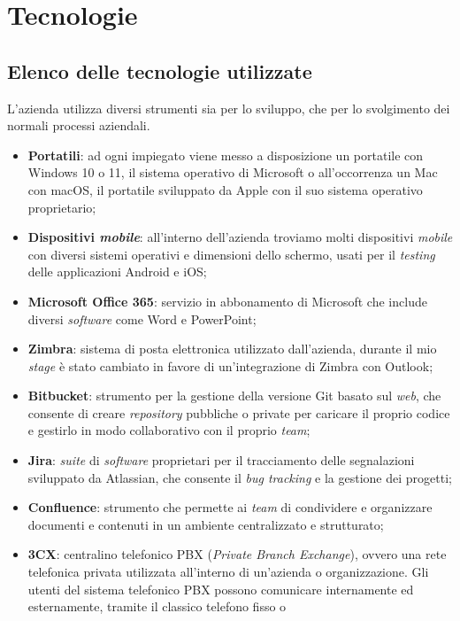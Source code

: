 \section{Tecnologie}\label{chap:Tecnologie}
\subsection{Elenco delle tecnologie utilizzate}
L'azienda utilizza diversi strumenti sia per lo sviluppo, che per lo svolgimento dei normali processi aziendali.
\begin{itemize}
    \item \textbf{Portatili}: ad ogni impiegato viene messo a disposizione un portatile con Windows 10 o 11, il sistema 
          operativo di Microsoft o all'occorrenza un Mac con macOS, il portatile sviluppato da Apple con il suo sistema operativo proprietario;
    \item \textbf{Dispositivi \textit{mobile}}: all'interno dell'azienda troviamo molti dispositivi \textit{mobile} con diversi sistemi operativi e dimensioni 
          dello schermo, usati per il \textit{testing} delle applicazioni Android e iOS;
    \item \textbf{Microsoft Office 365}: servizio in abbonamento di Microsoft che include diversi \textit{software} come Word e PowerPoint;
    \item \textbf{Zimbra}: sistema di posta elettronica utilizzato dall'azienda, durante il mio \textit{stage} è stato cambiato in favore di un'integrazione di Zimbra 
          con Outlook;
    \item \textbf{Bitbucket}: strumento per la gestione della versione Git basato sul \textit{web}, che consente di creare 
          \textit{repository} pubbliche o private per caricare il proprio codice e gestirlo in modo collaborativo con il proprio 
          \textit{team};
    \item \textbf{Jira}: \textit{suite} di \textit{software} proprietari per il tracciamento delle segnalazioni sviluppato
           da Atlassian, che consente il \textit{bug tracking} e la gestione dei progetti;
    \item \textbf{Confluence}: strumento che permette ai \textit{team} di condividere e organizzare documenti e contenuti 
          in un ambiente centralizzato e strutturato;
    \item \textbf{3CX}: centralino telefonico PBX (\textit{Private Branch Exchange}), ovvero una rete telefonica privata utilizzata all'interno di un'azienda 
          o organizzazione. Gli utenti del sistema telefonico PBX possono comunicare internamente ed esternamente, tramite il classico telefono fisso o 

\end{itemize}
